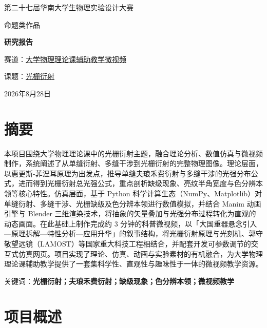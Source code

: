 \documentclass[12pt,a4paper]{ctexrep}
\begin{document}
\begin{titlepage}
\begin{center}
\vspace*{1.5cm}
{\heiti 第二十七届华南大学生物理实验设计大赛\par}
\vspace{0.8cm}
{\heiti 命题类作品\par}
\vspace{0.8cm}
{\fontsize{48pt}{58pt}\selectfont\bfseries 研究报告\par}
\vspace{1cm}
\vspace{2.5cm}
{ 赛道：\underline{大学物理理论课辅助教学微视频}\par}
\vspace{1.2cm}
{ 课题：\underline{光栅衍射}\par}
\vspace{1.2cm}
\vfill
{ 2026年8月28日\par}
\end{center}
\end{titlepage}

\chapter*{摘要}

本项目围绕大学物理理论课中的光栅衍射主题，融合理论分析、数值仿真与微视频制作，系统阐述了从单缝衍射、多缝干涉到光栅衍射的完整物理图像。理论层面，以惠更斯-菲涅耳原理为出发点，推导单缝夫琅禾费衍射与多缝干涉的光强分布公式，进而得到光栅衍射总光强公式，重点剖析缺级现象、亮纹半角宽度与色分辨本领等核心特性。仿真层面，基于 Python 科学计算生态（NumPy、Matplotlib）对单缝衍射、多缝干涉、光栅缺级及色分辨本领进行数值模拟，并结合 Manim 动画引擎与 Blender 三维渲染技术，将抽象的矢量叠加与光强分布过程转化为直观的动态画面。在此基础上制作完成约 3 分钟的科普微视频，以「大国重器悬念引入—原理拆解—特性分析—应用升华」的叙事结构，将光栅衍射原理与光刻机、郭守敬望远镜（LAMOST）等国家重大科技工程相结合，并配套开发可参数调节的交互式仿真网页。项目实现了理论、仿真、动画与实验素材的有机融合，为大学物理理论课辅助教学提供了一套集科学性、直观性与趣味性于一体的微视频教学资源。

\noindent 关键词：\textbf{光栅衍射；夫琅禾费衍射；缺级现象；色分辨本领；微视频教学}

\tableofcontents

\chapter{项目概述}
\end{document}
